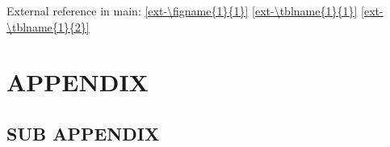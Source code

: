 \documentclass[12pt, lettersize]{article}
\begin{document}

\newpage



\newpage







External reference in main:
\ref{ext-\figname{1}{1}}
\ref{ext-\tblname{1}{1}}
\ref{ext-\tblname{1}{2}}

\newpage
\printbibliography


\newpage
\appendix

\section{APPENDIX}
\lipsum[1]

\subsection{SUB APPENDIX}
\lipsum[1-2]

\end{document}
